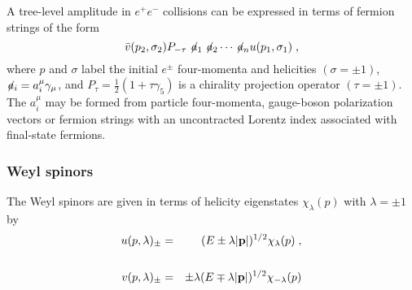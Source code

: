 \documentclass[11pt,twoside]{article}  %
\begin{document}

A tree-level amplitude in $e^+e^-$ collisions can be expressed in
terms of fermion strings of the form
\begin{equation}
\bar v(p_2,\sigma_2)P_{-\tau}\not\!a_1\not\!a_2\cdots
\not\!a_nu(p_1,\sigma_1)\;,
\end{equation}
where $p$ and $\sigma$ label the initial $e^{\pm}$ four-momenta and
helicities $(\sigma = \pm 1)$, $\not\!a_i=a^\mu_i\gamma_\mu$, and
$P_\tau=\frac{1}{2}(1+\tau\gamma_5)$ is a chirality projection
operator $(\tau = \pm1)$.  The $a^\mu_i$ may be formed from particle
four-momenta, gauge-boson polarization vectors or fermion strings with
an uncontracted Lorentz index associated with final-state fermions.

\subsubsection{Weyl spinors}

The Weyl spinors are given in terms of helicity eigenstates
$\chi_\lambda(p)$ with $\lambda=\pm1$ by
\begin{eqnarray}
u(p,\lambda)_\pm & = & (E\pm\lambda|{\bf p}|)^{1/2}\chi_\lambda(p)\;,
\nonumber \\ & & \\
v(p,\lambda)_\pm & = & \pm\lambda(E\mp\lambda|{\bf p}|)^{1/2}\chi
_{-\lambda}(p) \nonumber
\end{eqnarray}

%
%
\end{document}
